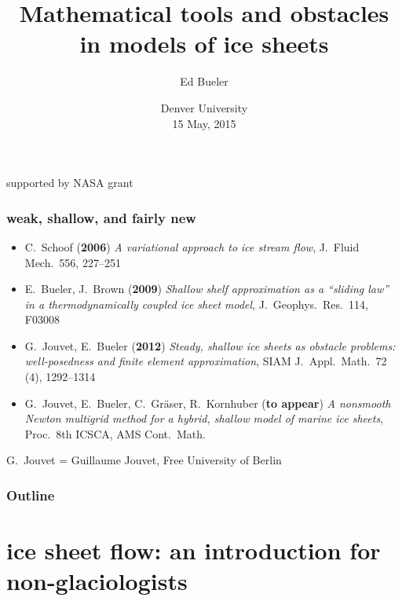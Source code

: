 \documentclass{beamer}
\title[math tools and obstacles in ice sheet models]{Mathematical tools and obstacles \\ in models of ice sheets}
\author[Bueler]{Ed Bueler}
\institute[UAF]{
  \tiny Dept of Mathematics and Statistics and Geophysical Institute \\

  University of Alaska Fairbanks
}
\date{\tiny Denver University \\ 15 May, 2015}
\begin{document}
\graphicspath{{../commonfigs/}}

\begin{frame}
  \titlepage
  \begin{center}
  \tiny supported by NASA grant 
  \end{center}
\end{frame}


\begin{frame}
  \frametitle{weak, shallow, and fairly new}

\begin{itemize}
\small
\item C.~Schoof (\textbf{2006}) \emph{A variational approach to ice stream flow}, J.~Fluid Mech.~556, 227--251
\medskip
\item E.~Bueler, J.~Brown (\textbf{2009}) \emph{Shallow shelf approximation as a “sliding law” in a thermodynamically coupled ice sheet model}, J.~Geophys.~Res.~114, F03008
\medskip
\item \alert{G.~Jouvet}, E.~Bueler (\textbf{2012}) \emph{Steady, shallow ice sheets as obstacle problems: well-posedness and finite element approximation}, SIAM J.~Appl.~Math.~72 (4), 1292--1314
\medskip
\item \alert{G.~Jouvet}, E.~Bueler, C.~Gr\"aser, R.~Kornhuber (\textbf{to appear})  \emph{A nonsmooth Newton multigrid method for a hybrid, shallow model of marine ice sheets}, Proc.~8th ICSCA, AMS Cont.~Math.
\end{itemize}

\medskip
\small
\alert{G.~Jouvet} = Guillaume Jouvet, Free University of Berlin
\end{frame}


\begin{frame}
  \frametitle{Outline}
  \tableofcontents[hideallsubsections]
\end{frame}


\section[intro]{ice sheet flow: an introduction for non-glaciologists}
\end{document}
